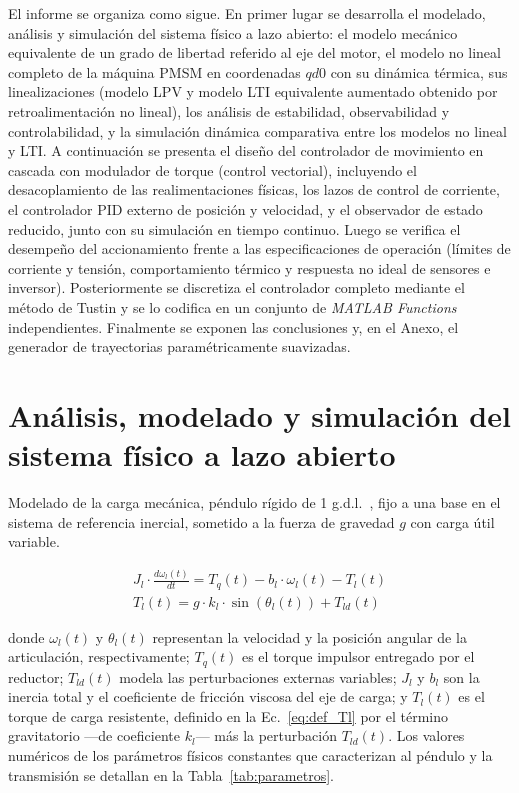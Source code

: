 \documentclass[12pt, a4paper,journal, onecolumn, compsoc]{IEEEtran}
\begin{document}
El informe se organiza como sigue. En primer lugar se desarrolla el modelado, análisis y simulación del sistema físico a lazo abierto: el modelo mecánico equivalente de un grado de libertad referido al eje del motor, el modelo no lineal completo de la máquina PMSM en coordenadas $qd0$ con su dinámica térmica, sus linealizaciones (modelo LPV y modelo LTI equivalente aumentado obtenido por retroalimentación no lineal), los análisis de estabilidad, observabilidad y controlabilidad, y la simulación dinámica comparativa entre los modelos no lineal y LTI. A continuación se presenta el diseño del controlador de movimiento en cascada con modulador de torque (control vectorial), incluyendo el desacoplamiento de las realimentaciones físicas, los lazos de control de corriente, el controlador PID externo de posición y velocidad, y el observador de estado reducido, junto con su simulación en tiempo continuo. Luego se verifica el desempeño del accionamiento frente a las especificaciones de operación (límites de corriente y tensión, comportamiento térmico y respuesta no ideal de sensores e inversor). Posteriormente se discretiza el controlador completo mediante el método de Tustin y se lo codifica en un conjunto de \textit{MATLAB Functions} independientes. Finalmente se exponen las conclusiones y, en el Anexo, el generador de trayectorias paramétricamente suavizadas.

\section{Análisis, modelado y simulación del sistema físico a lazo abierto}
Modelado de la carga mecánica, péndulo rígido de 1 g.d.l.~\cite{kelly_robot}, fijo a una base en el sistema de referencia inercial, sometido a la fuerza de gravedad \(g\) con carga útil variable.

\begin{align}
    J_l\cdot \frac{d\omega_l(t)}{dt} = T_q(t) - b_l\cdot \omega_l(t) - T_l(t)  \label{eq:din_pendulo} \\
    T_l(t) = g\cdot k_l \cdot \sin(\theta_l(t)) + T_{ld}(t) \label{eq:def_Tl}
\end{align}

donde $\omega_l(t)$ y $\theta_l(t)$ representan la velocidad y la posición angular de la articulación, respectivamente; $T_q(t)$ es el torque impulsor entregado por el reductor; $T_{ld}(t)$ modela las perturbaciones externas variables; $J_l$ y $b_l$ son la inercia total y el coeficiente de fricción viscosa del eje de carga; y $T_l(t)$ es el torque de carga resistente, definido en la Ec.~\eqref{eq:def_Tl} por el término gravitatorio ---de coeficiente $k_l$--- más la perturbación $T_{ld}(t)$. Los valores numéricos de los parámetros físicos constantes que caracterizan al péndulo y la transmisión se detallan en la Tabla~\ref{tab:parametros}.
\end{document}
